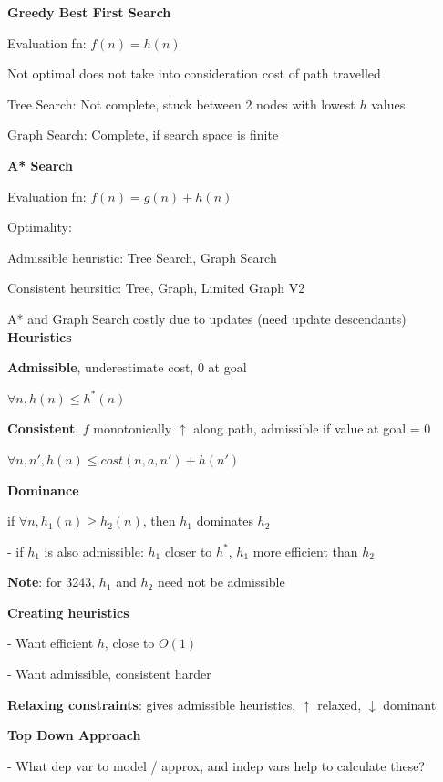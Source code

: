 \documentclass[10pt, a4paper]{article}
\newcommand{\highlight}[1]{{\color{red}\textbf{#1}}}
\newcommand{\red}[1]{{\color{red}#1}}
\newcommand{\green}[1]{{\color{PineGreen}#1}}
\newcommand{\header}[1]{{\normalsize\textbf{#1}}}
\newcommand{\tab}[0]{\hspace*{2mm}}
\begin{document}
\begin{multicols*}{3}

		\textbf{Greedy Best First Search}

		Evaluation fn: \green{$f(n) = h(n)$}

		\red{Not optimal} does not take into consideration cost of path travelled

		Tree Search: \red{Not complete}, stuck between 2 nodes with lowest $h$ values

		Graph Search: \green{Complete}, if search space is finite

		\textbf{A* Search}

		Evaluation fn: \green{$f(n) = g(n) + h(n)$}

		Optimality:

		\tab Admissible heuristic: Tree Search, Graph Search

		\tab Consistent heursitic: Tree, Graph, Limited Graph V2

		A* and Graph Search \red{costly} due to updates (need update descendants)\\

		\header{Heuristics}

		\textbf{Admissible}, underestimate cost, 0 at goal

		$\forall n, h(n) \leq h^{*}(n)$

		\textbf{Consistent}, $f$ monotonically $\uparrow$ along path, admissible if value at goal = 0

		$\forall n, n', h(n) \leq cost(n, a, n') + h(n')$

		\textbf{Dominance}

		if $\forall n, h_{1}(n) \geq h_{2}(n)$, then $h_{1}$ dominates $h_{2}$

		- if $h_{1}$ is also admissible: $h_{1}$ \green{closer} to $h^{*}$, $h_{1}$ more \green{efficient} than $h_{2}$

		\highlight{Note}: for 3243, $h_{1}$ and $h_{2}$ need not be admissible

		\textbf{Creating heuristics}

		- Want \green{efficient} $h$, close to $O(1)$

		- Want \green{admissible}, consistent harder

		\textbf{Relaxing constraints}: gives admissible heuristics, $\uparrow$ relaxed, $\downarrow$ dominant

		\textbf{Top Down Approach}

		- What dep var to model / approx, and indep vars help to calculate these?


\end{multicols*}
\end{document}
